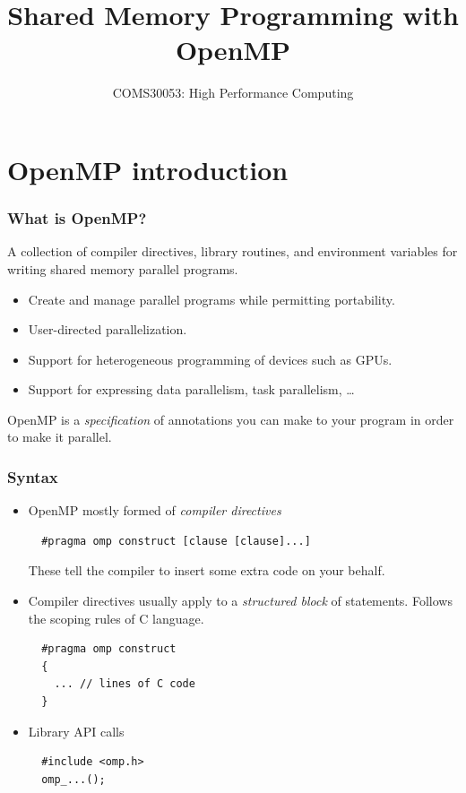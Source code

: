 \documentclass[aspectratio=169]{beamer}
\title{Shared Memory Programming with OpenMP}
\subtitle{COMS30053: High Performance Computing}
\begin{document}
\frame{\titlepage}

\section{OpenMP introduction}
\begin{frame}
\frametitle{What is OpenMP?}

A collection of compiler directives, library routines, and environment variables for writing shared memory parallel programs.

\begin{itemize}
  \item Create and manage parallel programs while permitting portability.
  \item User-directed parallelization.
  \item Support for heterogeneous programming of devices such as GPUs.
  \item Support for expressing data parallelism, task parallelism, \dots
\end{itemize}

OpenMP is a \emph{specification} of annotations you can make to your program in order to make it parallel.

\end{frame}

\begin{frame}[fragile]
\frametitle{Syntax}
\begin{itemize}
\item OpenMP mostly formed of \emph{compiler directives}\\
  \begin{verbatim}
  #pragma omp construct [clause [clause]...]
  \end{verbatim}
  These tell the compiler to insert some extra code on your behalf.

\item Compiler directives usually apply to a \emph{structured block} of statements.
Follows the scoping rules of C language.
  \begin{verbatim}
  #pragma omp construct
  {
    ... // lines of C code
  }
  \end{verbatim}

\item Library API calls
  \begin{verbatim}
  #include <omp.h>
  omp_...();
  \end{verbatim}

\end{itemize}
\end{frame}
\end{document}
